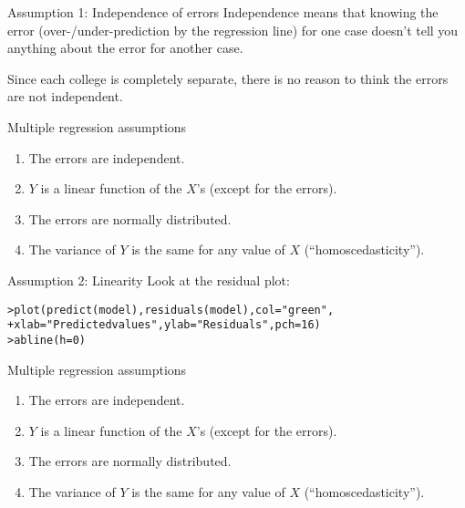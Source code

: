 \documentclass{beamer}\usepackage[]{graphicx}\usepackage[]{color}
\makeatletter
\newcommand{\hlnum}[1]{\textcolor[rgb]{0.824,0.412,0.118}{#1}}%
\newcommand{\hlstr}[1]{\textcolor[rgb]{1,0.894,0.71}{#1}}%
\newcommand{\hlstd}[1]{\textcolor[rgb]{1,0.894,0.769}{#1}}%
\newcommand{\hlkwc}[1]{\textcolor[rgb]{0.78,0.941,0.545}{#1}}%
\newcommand{\hlkwd}[1]{\textcolor[rgb]{1,0.78,0.769}{#1}}%
\newenvironment{kframe}{%
 \def\at@end@of@kframe{}%
 \ifinner\ifhmode%
  \def\at@end@of@kframe{\end{minipage}}%
  \begin{minipage}{\columnwidth}%
 \fi\fi%
 \def\FrameCommand##1{\hskip\@totalleftmargin \hskip-\fboxsep
 \colorbox{shadecolor}{##1}\hskip-\fboxsep
     \hskip-\linewidth \hskip-\@totalleftmargin \hskip\columnwidth}%
 \MakeFramed {\advance\hsize-\width
   \@totalleftmargin\z@ \linewidth\hsize
   \@setminipage}}%
 {\par\unskip\endMakeFramed%
 \at@end@of@kframe}
\newenvironment{knitrout}{}{} %
\makeatother
\begin{document}
\begin{darkframes}
    \begin{frame}{Assumption 1: Independence of errors}
      Independence means that knowing the error (over-/under-prediction by the regression line) for one case doesn't tell you anything about the error for another case.

      \bigskip\pause

      Since each college is completely separate, there is no reason to think the errors are not independent.
    \end{frame}

    \begin{frame}{Multiple regression assumptions}
      \begin{enumerate}
        \item The errors are independent. \greencheckmark
        \item $Y$ is a linear function of the $X$'s (except for the errors).
        \item The errors are normally distributed.
        \item The variance of $Y$ is the same for any value of $X$ (``homoscedasticity'').
      \end{enumerate}
    \end{frame}

    \begin{frame}[fragile]{Assumption 2: Linearity}
      Look at the residual plot:
      \fontsm
\begin{knitrout}
\begin{kframe}
\begin{alltt}
\hlstd{> }\hlkwd{plot}\hlstd{(}\hlkwd{predict}\hlstd{(model),} \hlkwd{residuals}\hlstd{(model),} \hlkwc{col}\hlstd{=}\hlstr{"green"}\hlstd{,}
\hlstd{+ }  \hlkwc{xlab}\hlstd{=}\hlstr{"Predicted values"}\hlstd{,} \hlkwc{ylab}\hlstd{=}\hlstr{"Residuals"}\hlstd{,} \hlkwc{pch}\hlstd{=}\hlnum{16}\hlstd{)}
\hlstd{> }\hlkwd{abline}\hlstd{(}\hlkwc{h}\hlstd{=}\hlnum{0}\hlstd{)}
\end{alltt}
\end{kframe}


\end{knitrout}
    \end{frame}

    \begin{frame}{Multiple regression assumptions}
      \begin{enumerate}
        \item The errors are independent. \greencheckmark
        \item $Y$ is a linear function of the $X$'s (except for the errors). \greencheckmark
        \item The errors are normally distributed.
        \item The variance of $Y$ is the same for any value of $X$ (``homoscedasticity'').
      \end{enumerate}
    \end{frame}


\end{darkframes}
\end{document}
